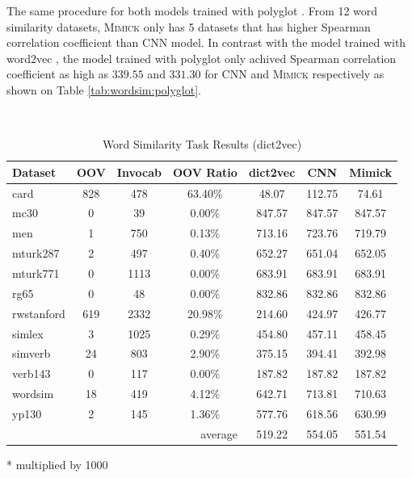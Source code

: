     The same procedure for both models trained with polyglot
    \citep{polyglot2013alrfou}. From 12 word similarity datasets,
    \textsc{Mimick} only has 5 datasets that has higher Spearman
    correlation coefficient than CNN model. In contrast with the model
    trained with word2vec \citep{Distributed2013mikolov}, the model
    trained with polyglot \citep{polyglot2013alrfou} only achived
    Spearman correlation coefficient as high as $339.55$ and $331.30$
    for CNN and \textsc{Mimick} respectively as shown on Table
    \ref{tab:wordsim:polyglot}.

    \begin{table}[!ht]
      \begin{threeparttable} 
      \begin{center}
        \caption{Word Similarity Task Results (dict2vec)}
        ~\\
        \label{tab:wordsim:dict2vec}
        \begin{tabular}{l|c|c|c|c|c|c}
          \textbf{Dataset} & \textbf{OOV} & \textbf{Invocab} &
          \textbf{OOV Ratio} & \textbf{dict2vec}\tnote{*} &
          \textbf{CNN}\tnote{*} & \textbf{Mimick}\tnote{*}\\
          \hline
          card & 828 & 478 & 63.40\% & 48.07 & 112.75 & 74.61\\
          mc30 & 0 & 39 & 0.00\% & 847.57 & 847.57 & 847.57\\
          men & 1 & 750 & 0.13\% & 713.16 & 723.76 & 719.79\\
          mturk287 & 2 & 497 & 0.40\% & 652.27 & 651.04 & 652.05\\
          mturk771 & 0 & 1113 & 0.00\% & 683.91 & 683.91 & 683.91\\
          rg65 & 0 & 48 & 0.00\% & 832.86 & 832.86 & 832.86\\
          rwstanford & 619 & 2332 & 20.98\% & 214.60 & 424.97 & 426.77\\
          simlex & 3 & 1025 & 0.29\% & 454.80 & 457.11 & 458.45\\
          simverb & 24 & 803 & 2.90\% & 375.15 & 394.41 & 392.98\\
          verb143 & 0 & 117 & 0.00\% & 187.82 & 187.82 & 187.82\\
          wordsim & 18 & 419 & 4.12\% & 642.71 & 713.81 & 710.63\\
          yp130 & 2 & 145 & 1.36\% & 577.76 & 618.56 & 630.99\\
          \hline
          \multicolumn{4}{r|}{average} & 519.22 & 554.05 & 551.54\\
        \end{tabular}
        \begin{tablenotes}
          \item[*] multiplied by 1000
        \end{tablenotes}
      \end{center}
    \end{threeparttable} 
    \end{table}

